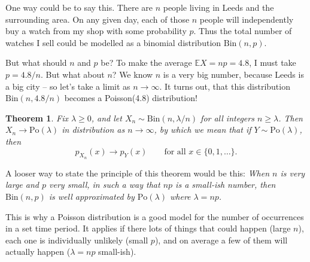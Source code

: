 \documentclass[
  a4paper,
]{book}
\newtheorem{theorem}{Theorem}[chapter]
\theoremstyle{definition}
\theoremstyle{definition}
\theoremstyle{definition}
\theoremstyle{definition}
\theoremstyle{remark}
\begin{document}
One way could be to say this. There are \(n\) people living in Leeds and the surrounding area. On any given day, each of those \(n\) people will independently buy a watch from my shop with some probability \(p\). Thus the total number of watches I sell could be modelled as a binomial distribution \(\text{Bin}(n, p)\).

But what should \(n\) and \(p\) be? To make the average \(\mathbb EX = np = 4.8\), I must take \(p = 4.8/n\). But what about \(n\)? We know \(n\) is a very big number, because Leeds is a big city -- so let's take a limit as \(n \to \infty\). It turns out, that this distribution \(\text{Bin}(n, 4.8/n)\) becomes a Poisson(4.8) distribution!

\begin{theorem}
\protect\hypertarget{thm:po-bint}{}\label{thm:po-bint}Fix \(\lambda \geq 0\), and let \(X_n \sim \text{Bin}(n, \lambda/n)\) for all integers \(n \geq \lambda\). Then \(X_n \to \text{Po}(\lambda)\) in distribution as \(n \to \infty\), by which we mean that if \(Y \sim \text{Po}(\lambda)\), then
\[ p_{X_n}(x) \to p_Y(x) \qquad \text{for all $x \in \{0, 1, \dots \}$}. \]
\end{theorem}

A looser way to state the principle of this theorem would be this: \emph{When \(n\) is very large and \(p\) very small, in such a way that \(np\) is a small-ish number, then \(\text{Bin}(n,p)\) is well approximated by \(\text{Po}(\lambda)\) where \(\lambda = np\).}

This is why a Poisson distribution is a good model for the number of occurrences in a set time period. It applies if there lots of things that could happen (large \(n\)), each one is individually unlikely (small \(p\)), and on average a few of them will actually happen (\(\lambda = np\) small-ish).
\end{document}
